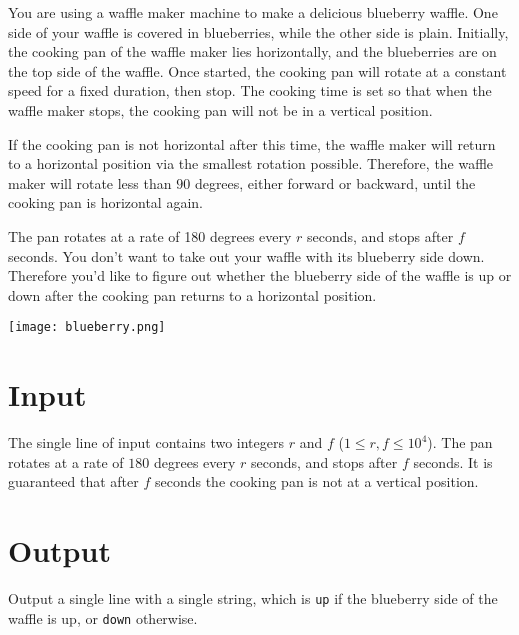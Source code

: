 
You are using a waffle maker machine to make a delicious blueberry 
waffle. One side of your waffle is covered in blueberries, while the 
other side is plain. Initially, the cooking pan of the waffle maker lies 
horizontally, and the blueberries are on the top side of the waffle.
Once started, the cooking pan will rotate at a constant 
speed for a fixed duration, then stop. The cooking time is set so
that when the waffle maker stops, the cooking pan will not be in a 
vertical position.

If the cooking pan is not horizontal 
after this time, the waffle maker will return to a 
horizontal position via the smallest rotation possible. Therefore, the
waffle maker will rotate less than $90$ 
degrees, either forward or backward, until the cooking pan is horizontal again.

The pan rotates at a rate of 180 degrees every $r$ seconds, and stops after $f$ seconds.
You don't want to take out your waffle with its blueberry 
side down. Therefore you'd like to figure out whether the blueberry side 
of the waffle is up or down after the cooking pan returns to a horizontal 
position.

\begin{center}
\texttt{[image: blueberry.png]}
\end{center}

\section*{Input} The single line of input contains two integers $r$ 
and $f$ ($1 \leq r, f \leq 10^4$). The pan rotates at a rate of $180$ degrees every $r$ seconds, and stops after $f$ seconds. It is guaranteed that after $f$ 
seconds the cooking pan is not at a vertical position.

\section*{Output} Output a single line with a single string, which is {\tt up} if the blueberry side of the waffle is 
up, or {\tt down} otherwise.


